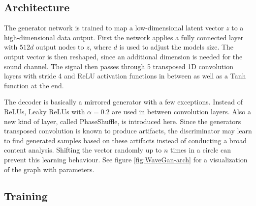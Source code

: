 \documentclass[12pt]{article}
\begin{document}
\subsection{Architecture}
The generator network is trained to map a low-dimensional latent vector $z$ to a high-dimensional data output.
First the network applies a fully connected layer with $512d$ output nodes to $z$, where $d$ is used to adjust the models size.
The output vector is then reshaped, since an additional dimension is needed for the sound channel.
The signal then passes through 5 transposed 1D convolution layers with stride 4 and ReLU activation functions in between as well as a Tanh function at the end.

The decoder is basically a mirrored generator with a few exceptions.
Instead of ReLUs, Leaky ReLUs with $\alpha=0.2$ are used in between convolution layers.
Also a new kind of layer, called PhaseShuffle, is introduced here. 
Since the generators transposed convolution is known to produce artifacts, the discriminator may learn to find generated samples based on these artifacts instead of conducting a broad content analysis.
Shifting the vector randomly up to $n$ times in a circle can prevent this learning behaviour.
See figure \ref{fig:WaveGan-arch} for a visualization of the graph with parameters.




\subsection{Training}
\end{document}
